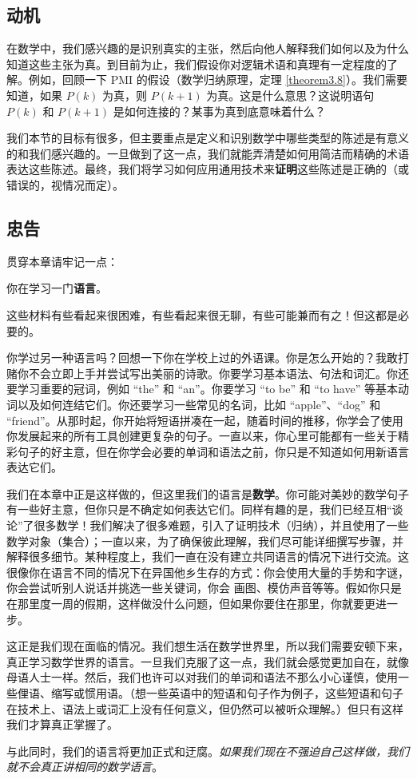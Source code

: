 \subsection{动机}

在数学中，我们感兴趣的是识别真实的主张，然后向他人解释我们如何以及为什么知道这些主张为真。到目前为止，我们假设你对逻辑术语和真理有一定程度的了解。例如，回顾一下 PMI 的假设（数学归纳原理，定理 \ref{theorem3.8}）。我们需要知道，如果 $P(k)$ 为真，则 $P(k+1)$ 为真。这是什么意思？这说明语句 $P(k)$ 和 $P(k + 1)$ 是如何连接的？某事为真到底意味着什么？

我们本节的目标有很多，但主要重点是定义和识别数学中哪些类型的陈述是有意义的和我们感兴趣的。一旦做到了这一点，我们就能弄清楚如何用简洁而精确的术语表达这些陈述。最终，我们将学习如何应用通用技术来\textbf{证明}这些陈述是正确的（或错误的，视情况而定）。

\subsection{忠告}

贯穿本章请牢记一点：

\begin{center}
    你在学习一门\textbf{语言}。
\end{center}

这些材料有些看起来很困难，有些看起来很无聊，有些可能兼而有之！但这都是必要的。

你学过另一种语言吗？回想一下你在学校上过的外语课。你是怎么开始的？我敢打赌你不会立即上手并尝试写出美丽的诗歌。你要学习基本语法、句法和词汇。你还要学习重要的冠词，例如 ``the'' 和 ``an''。你要学习 ``to be'' 和 ``to have'' 等基本动词以及如何连结它们。你还要学习一些常见的名词，比如 ``apple''、``dog'' 和 ``friend''。从那时起，你开始将短语拼凑在一起，随着时间的推移，你学会了使用你发展起来的所有工具创建更复杂的句子。一直以来，你心里可能都有一些关于精彩句子的好主意，但在你学会必要的单词和语法之前，你只是不知道如何用新语言表达它们。

我们在本章中正是这样做的，但这里我们的语言是\textbf{数学}。你可能对美妙的数学句子有一些好主意，但你只是不确定如何表达它们。同样有趣的是，我们已经互相``谈论''了很多数学！我们解决了很多难题，引入了证明技术（归纳），并且使用了一些数学对象（集合）；一直以来，为了确保彼此理解，我们尽可能详细撰写步骤，并解释很多细节。某种程度上，我们一直在没有建立共同语言的情况下进行交流。这很像你在语言不同的情况下在异国他乡生存的方式：你会使用大量的手势和字谜，你会尝试听别人说话并挑选一些关键词，你会 画图、模仿声音等等。假如你只是在那里度一周的假期，这样做没什么问题，但如果你要住在那里，你就要更进一步。

这正是我们现在面临的情况。我们想生活在数学世界里，所以我们需要安顿下来，真正学习数学世界的语言。一旦我们克服了这一点，我们就会感觉更加自在，就像母语人士一样。然后，我们也许可以对我们的单词和语法不那么小心谨慎，使用一些俚语、缩写或惯用语。（想一些英语中的短语和句子作为例子，这些短语和句子在技术上、语法上或词汇上没有任何意义，但仍然可以被听众理解。）但只有这样我们才算真正掌握了。

与此同时，我们的语言将更加正式和迂腐。\emph{如果我们现在不强迫自己这样做，我们就不会真正讲相同的数学语言}。